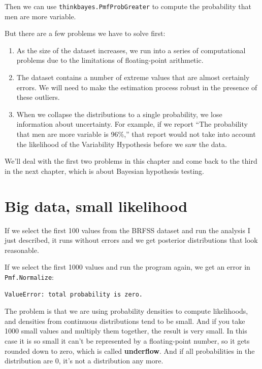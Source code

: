 \documentclass[12pt]{book}
\begin{document}
Then we can use \verb"thinkbayes.PmfProbGreater" to compute the
probability that men are more variable.

But there are a few problems we have to solve first:

\begin{enumerate}

\item As the size of the dataset increases, we run into a series of
  computational problems due to the limitations of floating-point
  arithmetic.

\item The dataset contains a number of extreme values that are almost
  certainly errors.  We will need to make the estimation process
  robust in the presence of these outliers.

\item When we collapse the distributions to a single probability, we
  lose information about uncertainty.  For example, if we report ``The
  probability that men are more variable is 96\%,'' that report would
  not take into account the likelihood of the Variability Hypothesis
  before we saw the data.

\end{enumerate}

We'll deal with the first two problems in this chapter and come
back to the third in the next chapter, which is about
Bayesian hypothesis testing.


\section{Big data, small likelihood}

If we select the first 100 values from the BRFSS dataset and run the
analysis I just described, it runs without errors and we get posterior
distributions that look reasonable.

If we select the first 1000 values and run the program again, we get
an error in \verb"Pmf.Normalize":

\begin{verbatim}
ValueError: total probability is zero.
\end{verbatim}

The problem is that we are using probability densities to compute
likelihoods, and densities from continuous distributions tend to be
small.  And if you take 1000 small values and multiply
them together, the result is very small.  In this case it is so small
it can't be represented by a floating-point number, so it gets rounded
down to zero, which is called {\bf underflow}.  And if all
probabilities in the distribution are 0, it's not a distribution any
more.
\end{document}
